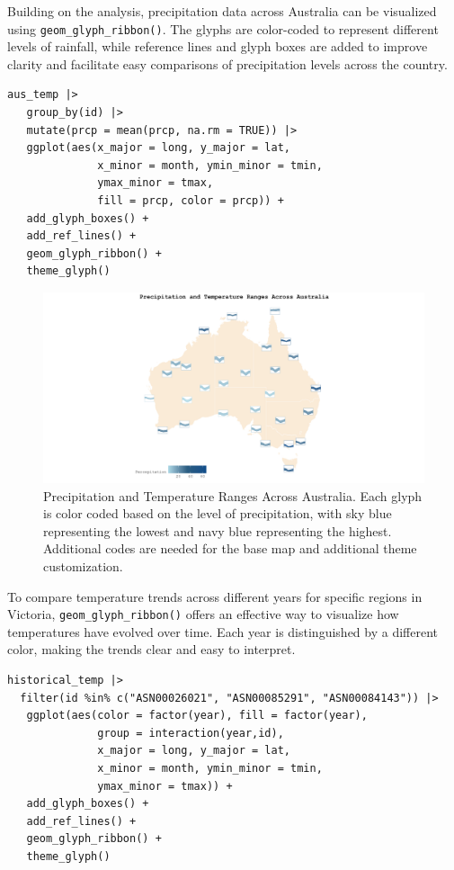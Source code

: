 Building on the analysis, precipitation data across Australia can be visualized using \texttt{geom\_glyph\_ribbon()}. The glyphs are color-coded to represent different levels of rainfall, while reference lines and glyph boxes are added to improve clarity and facilitate easy comparisons of precipitation levels across the country.

\begin{verbatim}
aus_temp |>
   group_by(id) |>
   mutate(prcp = mean(prcp, na.rm = TRUE)) |>
   ggplot(aes(x_major = long, y_major = lat,
              x_minor = month, ymin_minor = tmin,
              ymax_minor = tmax, 
              fill = prcp, color = prcp)) +
   add_glyph_boxes() +
   add_ref_lines() +
   geom_glyph_ribbon() +
   theme_glyph()
\end{verbatim}

\begin{figure}
\includegraphics[width=50in]{figures/prcp_temp} \caption{Precipitation and Temperature Ranges Across Australia. Each glyph is color coded based on the level of precipitation, with sky blue representing the lowest and navy blue representing the highest. Additional codes are needed for the base map and additional theme customization.}\label{fig:unnamed-chunk-11}
\end{figure}

To compare temperature trends across different years for specific regions in Victoria, \texttt{geom\_glyph\_ribbon()} offers an effective way to visualize how temperatures have evolved over time. Each year is distinguished by a different color, making the trends clear and easy to interpret.

\begin{verbatim}
historical_temp |> 
  filter(id %in% c("ASN00026021", "ASN00085291", "ASN00084143")) |>
   ggplot(aes(color = factor(year), fill = factor(year),
              group = interaction(year,id),
              x_major = long, y_major = lat,
              x_minor = month, ymin_minor = tmin, 
              ymax_minor = tmax)) +
   add_glyph_boxes() +
   add_ref_lines() +
   geom_glyph_ribbon() +
   theme_glyph()
\end{verbatim}


